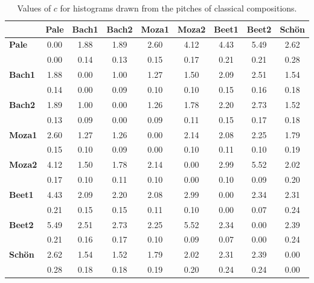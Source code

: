 \begin{table}[h!]
\scriptsize
\begin{center}
\begin{tabular}{| l | c || c | c || c | c || c | c || c |}\hline
 & {\bf Pale} & {\bf Bach1} & {\bf Bach2} & {\bf Moza1} & {\bf Moza2} & {\bf Beet1} & {\bf Beet2} & {\bf Sch\"on} \\\hline
{\bf Pale} & 0.00 & 1.88 & 1.89 & 2.60 & 4.12 & 4.43 & 5.49 & 2.62 \\
 & 0.00  & 0.14  & 0.13  & 0.15  & 0.17  & 0.21  & 0.21  & 0.28 \\\hline\hline
{\bf Bach1} & 1.88 & 0.00 & 1.00 & 1.27 & 1.50 & 2.09 & 2.51 & 1.54 \\
 & 0.14  & 0.00  & 0.09  & 0.10  & 0.10  & 0.15  & 0.16  & 0.18 \\\hline
{\bf Bach2} & 1.89 & 1.00 & 0.00 & 1.26 & 1.78 & 2.20 & 2.73 & 1.52 \\
 & 0.13  & 0.09  & 0.00  & 0.09  & 0.11  & 0.15  & 0.17  & 0.18 \\\hline\hline
{\bf Moza1} & 2.60 & 1.27 & 1.26 & 0.00 & 2.14 & 2.08 & 2.25 & 1.79 \\
 & 0.15  & 0.10  & 0.09  & 0.00  & 0.10  & 0.11  & 0.10  & 0.19 \\\hline
{\bf Moza2} & 4.12 & 1.50 & 1.78 & 2.14 & 0.00 & 2.99 & 5.52 & 2.02 \\
 & 0.17  & 0.10  & 0.11  & 0.10  & 0.00  & 0.10  & 0.09  & 0.20 \\\hline\hline
{\bf Beet1} & 4.43 & 2.09 & 2.20 & 2.08 & 2.99 & 0.00 & 2.34 & 2.31 \\
 & 0.21  & 0.15  & 0.15  & 0.11  & 0.10  & 0.00  & 0.07  & 0.24 \\\hline
{\bf Beet2} & 5.49 & 2.51 & 2.73 & 2.25 & 5.52 & 2.34 & 0.00 & 2.39 \\
 & 0.21  & 0.16  & 0.17  & 0.10  & 0.09  & 0.07  & 0.00  & 0.24 \\\hline\hline
{\bf Sch\"on} & 2.62 & 1.54 & 1.52 & 1.79 & 2.02 & 2.31 & 2.39 & 0.00 \\
 & 0.28  & 0.18  & 0.18  & 0.19  & 0.20  & 0.24  & 0.24  & 0.00 \\\hline
\end{tabular}
\caption{Values of $c$ for histograms drawn from the pitches of classical compositions.}
\end{center}
\end{table}